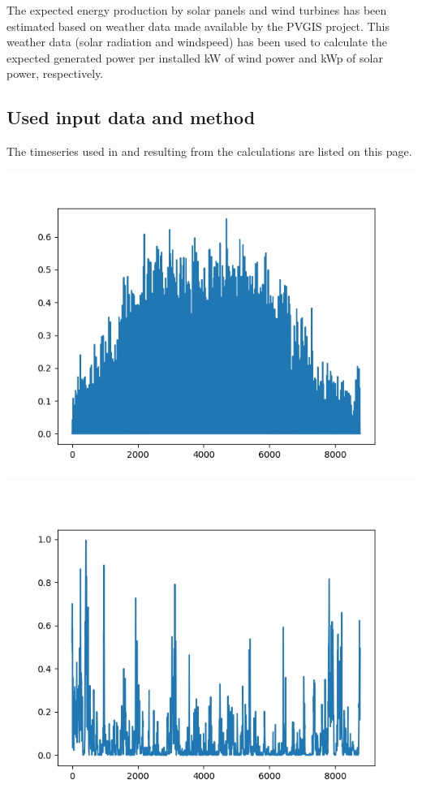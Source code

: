 \documentclass{article}[11pt]
\begin{document}
\begin{multicols}{2}
The expected energy production by solar panels and wind turbines has been estimated based on weather data made available by the PVGIS project. This weather data (solar radiation and windspeed) has been used to calculate the expected generated power per installed kW of wind power and kWp of solar power, respectively. \vfill\null\columnbreak\appendix

\subsection*{Used input data and method}

The timeseries used in and resulting from the calculations are listed on this page.

\begin{center}

\includegraphics[width=\linewidth]{per_unit_pv_generation.png}

\end{center}






\begin{center}

\includegraphics[width=\linewidth]{per_unit_wind_generation.png}


\end{center}
\end{multicols}
\end{document}
